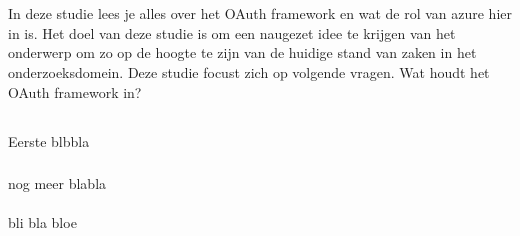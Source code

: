 \chapter{}
\label{ch:stand-van-zaken}



In deze studie lees je alles over het OAuth framework en wat de rol van azure hier in is. Het doel van deze studie is om een naugezet idee te krijgen van het onderwerp om zo op de hoogte te zijn van de huidige stand van zaken in het onderzoeksdomein. Deze studie focust zich op volgende vragen. Wat houdt het OAuth framework in? 
\section{}
\label{sec:Sectiehoofding}
Eerste blbbla
\subsection{}
nog meer blabla
\subsubsection{}
bli bla bloe